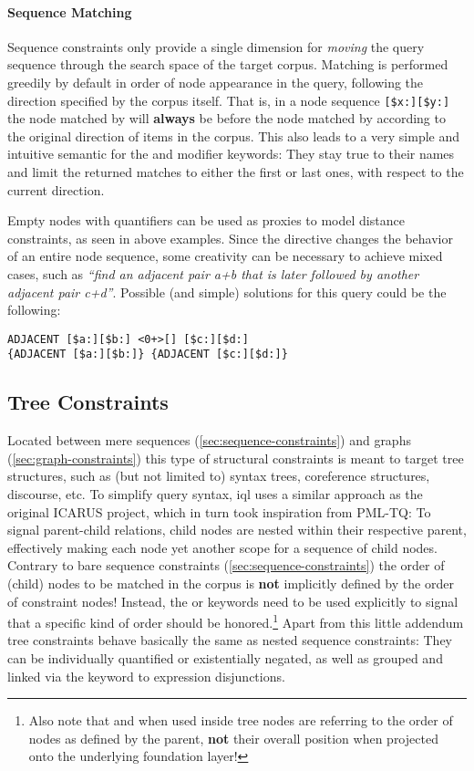 \documentclass[11pt,a4paper]{report}
\begin{document}
\paragraph{Sequence Matching}
\noindent Sequence constraints only provide a single dimension for \textit{moving} the query sequence through the search space of the target corpus.
Matching is performed greedily by default in order of node appearance in the query, following the direction specified by the corpus itself.
That is, in a node sequence \verb|[$x:][$y:]| the node matched by  will \textbf{always} be before the node matched by  according to the original direction of items in the corpus.
This also leads to a very simple and intuitive semantic for the  and  modifier keywords: They stay true to their names and limit the returned matches to either the first or last ones, with respect to the current direction.

Empty nodes with quantifiers can be used as proxies to model distance constraints, as seen in above examples.
Since the  directive changes the behavior of an entire node sequence, some creativity can be necessary to achieve mixed cases, such as \textit{``find an adjacent pair a+b that is later followed by another adjacent pair c+d''}.
Possible (and simple) solutions for this query could be the following:
\begin{Verbatim}[samepage=true]
ADJACENT [$a:][$b:] <0+>[] [$c:][$d:]
{ADJACENT [$a:][$b:]} {ADJACENT [$c:][$d:]}
\end{Verbatim}

\subsection{Tree Constraints}
\label{sec:tree-constraints}

Located between mere sequences (\ref{sec:sequence-constraints}) and graphs (\ref{sec:graph-constraints}) this type of structural constraints is meant to target tree structures, such as (but not limited to) syntax trees, coreference structures, discourse, etc.
To simplify query syntax, \ac{iql} uses a similar approach as the original ICARUS project, which in turn took inspiration from PML-TQ:
To signal parent-child relations, child nodes are nested within their respective parent, effectively making each node yet another scope for a sequence of child nodes.
Contrary to bare sequence constraints (\ref{sec:sequence-constraints}) the order of (child) nodes to be matched in the corpus is \textbf{not} implicitly defined by the order of constraint nodes!
Instead, the  or  keywords need to be used explicitly to signal that a specific kind of order should be honored.\footnote{Also note that  and  when used inside tree nodes are referring to the order of nodes as defined by the parent, \textbf{not} their overall position when projected onto the underlying foundation layer!}
Apart from this little addendum tree constraints behave basically the same as nested sequence constraints:
They can be individually quantified or existentially negated, as well as grouped and linked via the  keyword to expression disjunctions.
\end{document}
